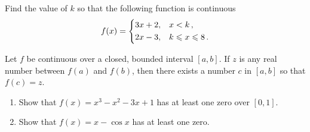 \documentclass[12pt]{amsart}
\begin{document}
\begin{question}
	Find the value of $k$ so that the following function is continuous
	\begin{equation*}
		f(x)
		=
		\begin{dcases}
			3x + 2, & x < k \,,           \\
			2x - 3, & k \leq x \leq 8 \,.
		\end{dcases}
	\end{equation*}
	\vspace{5cm}
\end{question}

\begin{theorem}
	Let $f$ be continuous over a closed, bounded interval $[a,b]$.
	If $z$ is any real number between $f(a)$ and $f(b)$, then there exists
	a number $c$ in $[a,b]$ so that $f(c) = z$.
\end{theorem}


\begin{question}
	\begin{enumerate}
		\item Show that $f(x) = x^3 - x^2 -3x + 1$ has at least one zero over $[0,1]$.
		      \vspace{5cm}
		\item Show that $f(x) = x - \cos x$ has at least one zero.
	\end{enumerate}
\end{question}







\printbibliography
\end{document}
